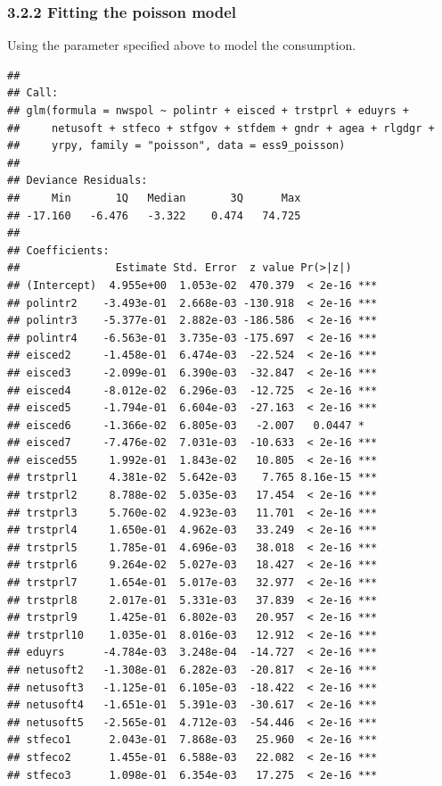 \documentclass[
]{article}
\begin{document}
\hypertarget{fitting-the-poisson-model}{%
\subsubsection{3.2.2 Fitting the poisson
model}\label{fitting-the-poisson-model}}

Using the parameter specified above to model the consumption.

\begin{verbatim}
## 
## Call:
## glm(formula = nwspol ~ polintr + eisced + trstprl + eduyrs + 
##     netusoft + stfeco + stfgov + stfdem + gndr + agea + rlgdgr + 
##     yrpy, family = "poisson", data = ess9_poisson)
## 
## Deviance Residuals: 
##     Min       1Q   Median       3Q      Max  
## -17.160   -6.476   -3.322    0.474   74.725  
## 
## Coefficients:
##               Estimate Std. Error  z value Pr(>|z|)    
## (Intercept)  4.955e+00  1.053e-02  470.379  < 2e-16 ***
## polintr2    -3.493e-01  2.668e-03 -130.918  < 2e-16 ***
## polintr3    -5.377e-01  2.882e-03 -186.586  < 2e-16 ***
## polintr4    -6.563e-01  3.735e-03 -175.697  < 2e-16 ***
## eisced2     -1.458e-01  6.474e-03  -22.524  < 2e-16 ***
## eisced3     -2.099e-01  6.390e-03  -32.847  < 2e-16 ***
## eisced4     -8.012e-02  6.296e-03  -12.725  < 2e-16 ***
## eisced5     -1.794e-01  6.604e-03  -27.163  < 2e-16 ***
## eisced6     -1.366e-02  6.805e-03   -2.007   0.0447 *  
## eisced7     -7.476e-02  7.031e-03  -10.633  < 2e-16 ***
## eisced55     1.992e-01  1.843e-02   10.805  < 2e-16 ***
## trstprl1     4.381e-02  5.642e-03    7.765 8.16e-15 ***
## trstprl2     8.788e-02  5.035e-03   17.454  < 2e-16 ***
## trstprl3     5.760e-02  4.923e-03   11.701  < 2e-16 ***
## trstprl4     1.650e-01  4.962e-03   33.249  < 2e-16 ***
## trstprl5     1.785e-01  4.696e-03   38.018  < 2e-16 ***
## trstprl6     9.264e-02  5.027e-03   18.427  < 2e-16 ***
## trstprl7     1.654e-01  5.017e-03   32.977  < 2e-16 ***
## trstprl8     2.017e-01  5.331e-03   37.839  < 2e-16 ***
## trstprl9     1.425e-01  6.802e-03   20.957  < 2e-16 ***
## trstprl10    1.035e-01  8.016e-03   12.912  < 2e-16 ***
## eduyrs      -4.784e-03  3.248e-04  -14.727  < 2e-16 ***
## netusoft2   -1.308e-01  6.282e-03  -20.817  < 2e-16 ***
## netusoft3   -1.125e-01  6.105e-03  -18.422  < 2e-16 ***
## netusoft4   -1.651e-01  5.391e-03  -30.617  < 2e-16 ***
## netusoft5   -2.565e-01  4.712e-03  -54.446  < 2e-16 ***
## stfeco1      2.043e-01  7.868e-03   25.960  < 2e-16 ***
## stfeco2      1.455e-01  6.588e-03   22.082  < 2e-16 ***
## stfeco3      1.098e-01  6.354e-03   17.275  < 2e-16 ***

\end{verbatim}
\end{document}
